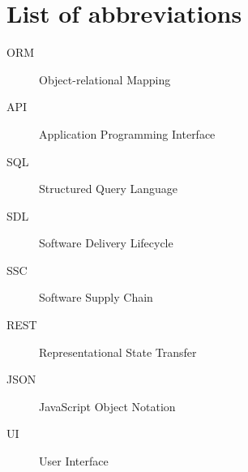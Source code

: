 \documentclass[../Main/thesis.tex]{subfiles}
\begin{document}
\chapter*{List of abbreviations}
\begin{description}
\item[ORM] Object-relational Mapping
\item[API] Application Programming Interface
\item[SQL] Structured Query Language
\item[SDL] Software Delivery Lifecycle
\item[SSC] Software Supply Chain
\item[REST] Representational State Transfer
\item[JSON] JavaScript Object Notation
\item[UI] User Interface
\end{description}
\end{document}
